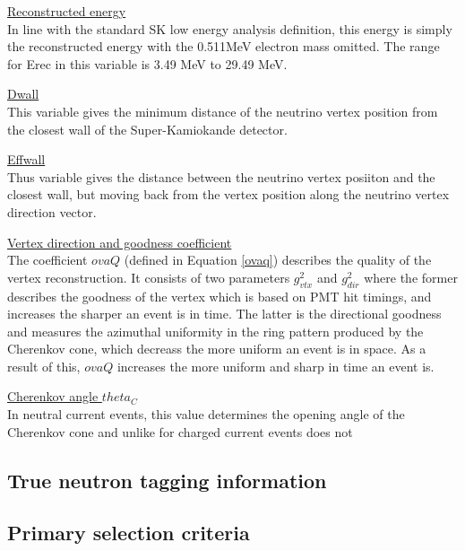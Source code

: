 \documentclass{article}
\begin{document}
 \underline{Reconstructed energy}\\
 In line with the standard SK low energy analysis definition, this energy is simply the reconstructed energy with the 0.511MeV electron mass omitted. The range for Erec in this variable is 3.49 MeV to 29.49 MeV.
\newline

 \underline{Dwall}\\
 This variable gives the minimum distance of the neutrino vertex position from the closest wall of the Super-Kamiokande detector.
\newline

 \underline{Effwall}\\
 Thus variable gives the distance between the neutrino vertex posiiton and the closest wall, but moving back from the vertex position along the neutrino vertex direction vector.
\newline

 \underline{Vertex direction and goodness coefficient}\\
 The coefficient $ovaQ$ (defined in Equation \ref{ovaq}) describes the quality of the vertex reconstruction. It consists of two parameters $g^2_{vtx}$ and $g^2_{dir}$ where the former describes the goodness of the vertex which is based on PMT hit timings, and increases the sharper an event is in time. The latter is the directional goodness and measures the azimuthal uniformity in the ring pattern produced by the Cherenkov cone, which decreass the more uniform an event is in space. As a result of this, $ovaQ$ increases the more uniform and sharp in time an event is.
\newline

 \underline{Cherenkov angle $theta_{C}$}\\
 In neutral current events, this value determines the opening angle of the Cherenkov cone and unlike for charged current events does not 
\newline

\subsection{True neutron tagging information}
\subsection{Primary selection criteria}
\end{document}
